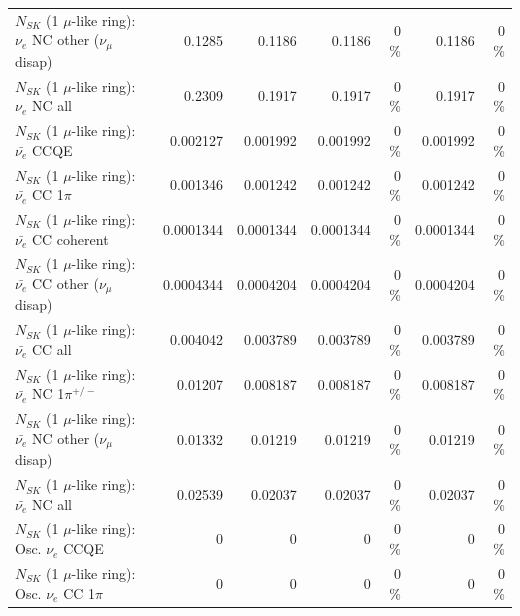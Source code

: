 \begin{table}
\begin{tabular}{| l | r | r | r  r | r  r |}
                $N_{SK}$ (1 $\mu$-like ring): $\nu_e$ NC other ($\nu_\mu$ disap) &          0.1285 &          0.1186 &          0.1186 &        0 \%  &          0.1186 &        0 \%  \\ 
                                  $N_{SK}$ (1 $\mu$-like ring): $\nu_{e}$ NC all &          0.2309 &          0.1917 &          0.1917 &        0 \%  &          0.1917 &        0 \%  \\ 
\hline
\hline
\hline
                                $N_{SK}$ (1 $\mu$-like ring): $\bar{\nu_e}$ CCQE &        0.002127 &        0.001992 &        0.001992 &        0 \%  &        0.001992 &        0 \%  \\ 
                           $N_{SK}$ (1 $\mu$-like ring): $\bar{\nu_e}$ CC 1$\pi$ &        0.001346 &        0.001242 &        0.001242 &        0 \%  &        0.001242 &        0 \%  \\ 
                         $N_{SK}$ (1 $\mu$-like ring): $\bar{\nu_e}$ CC coherent &       0.0001344 &       0.0001344 &       0.0001344 &        0 \%  &       0.0001344 &        0 \%  \\ 
          $N_{SK}$ (1 $\mu$-like ring): $\bar{\nu_e}$ CC other ($\nu_\mu$ disap) &       0.0004344 &       0.0004204 &       0.0004204 &        0 \%  &       0.0004204 &        0 \%  \\ 
                            $N_{SK}$ (1 $\mu$-like ring): $\bar{\nu_{e}}$ CC all &        0.004042 &        0.003789 &        0.003789 &        0 \%  &        0.003789 &        0 \%  \\ 
\hline
                     $N_{SK}$ (1 $\mu$-like ring): $\bar{\nu_e}$ NC 1$\pi^{+/-}$ &         0.01207 &        0.008187 &        0.008187 &        0 \%  &        0.008187 &        0 \%  \\ 
          $N_{SK}$ (1 $\mu$-like ring): $\bar{\nu_e}$ NC other ($\nu_\mu$ disap) &         0.01332 &         0.01219 &         0.01219 &        0 \%  &         0.01219 &        0 \%  \\ 
                            $N_{SK}$ (1 $\mu$-like ring): $\bar{\nu_{e}}$ NC all &         0.02539 &         0.02037 &         0.02037 &        0 \%  &         0.02037 &        0 \%  \\ 
\hline
\hline
\hline
                                 $N_{SK}$ (1 $\mu$-like ring): Osc. $\nu_e$ CCQE &               0 &               0 &               0 &        0 \%  &               0 &        0 \%  \\ 
                            $N_{SK}$ (1 $\mu$-like ring): Osc. $\nu_e$ CC 1$\pi$ &               0 &               0 &               0 &        0 \%  &               0 &        0 \%  \\ 

\end{tabular}
\end{table}
